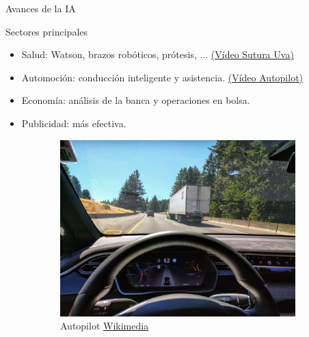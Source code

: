 \begin{frame}[fragile]{Avances de la IA}
\vspace{10px}
\pause
{}
\begin{block}{Sectores principales}
	\begin{itemize}
		\item Salud: Watson, brazos robóticos, prótesis, ... \href{https://www.youtube.com/watch?v=0XdC1HUp-rU}{(Vídeo Sutura Uva)}
		\pause
		\item Automoción: conducción inteligente y asistencia. \href{https://www.youtube.com/watch?v=IkSw2SZQENU}{(Vídeo Autopilot)}
		\pause
		\item Economía: análisis de la banca y operaciones en bolsa.
		\pause
		\item Publicidad: más efectiva.
	\end{itemize}
\end{block}
\begin{figure}
	\centering
	\pause
	\begin{subfigure}{0.45\textwidth}
		\centering
		\includegraphics[scale=0.025]{./EtapaModerna/Imagenes/autopilot.jpg}
		\caption{Autopilot \href{https://commons.wikimedia.org/wiki/File:Tesla_Autopilot_Engaged_in_Model_X.jpg}{Wikimedia}}
	\end{subfigure}
	\pause
	\begin{subfigure}{0.45\textwidth}
		\centering

\end{subfigure}
\end{figure}
\end{frame}
